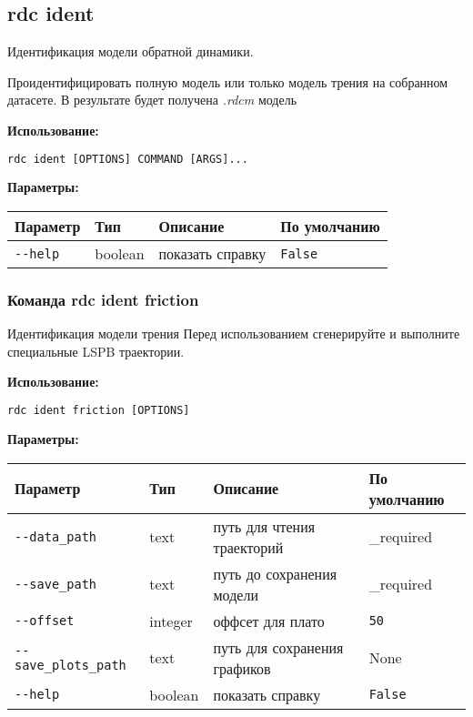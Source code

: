 \hypertarget{rdc-ident}{%
\subsection{rdc ident}\label{rdc-ident}}

Идентификация модели обратной динамики.

Проидентифицировать полную модель или только модель трения на собранном датасете. В результате будет получена \textit{.rdcm} модель

\textbf{Использование:}
\begin{lstlisting}[language=python, numbers=none, frame=single]
rdc ident [OPTIONS] COMMAND [ARGS]...
\end{lstlisting}

\textbf{Параметры:}
\begin{center}
\fontsize{10pt}{10pt}\selectfont
\begin{longtable}[]{p{5cm}|p{2cm}|p{3.5cm}|p{5cm}}
    \hline
\toprule()
Параметр & Тип & Описание & По умолчанию \\
\hline
\midrule()
\endhead
\texttt{-\/-help} & boolean & показать справку &
\texttt{False} \\
\bottomrule()
\hline
\end{longtable}
\end{center}

\hypertarget{rdc-ident-friction}{%
\subsubsection{ Команда rdc ident friction}\label{rdc-ident-friction}}
Идентификация модели трения
Перед использованием сгенерируйте и выполните специальные LSPB траектории.

\textbf{Использование:}
\begin{lstlisting}[language=python, numbers=none, frame=single]
rdc ident friction [OPTIONS]
\end{lstlisting}

\textbf{Параметры:}
\begin{center}
\fontsize{10pt}{10pt}\selectfont
\begin{longtable}[]{p{5cm}|p{2cm}|p{3.5cm}|p{5cm}}
    \hline
\toprule()
Параметр & Тип & Описание & По умолчанию \\
\hline
\midrule()
\endhead
\texttt{-\/-data\_path} & text & путь для чтения траекторий &
\_required \\
\hline
\texttt{-\/-save\_path} & text & путь до сохранения модели & \_required \\
\hline
\texttt{-\/-offset} & integer & оффсет для плато & \texttt{50} \\
\hline
\texttt{-\/-save\_plots\_path} & text & путь для сохранения графиков & None \\
\hline
\texttt{-\/-help} & boolean & показать справку &
\texttt{False} \\
\hline
\bottomrule()
\hline
\end{longtable}
\end{center}

